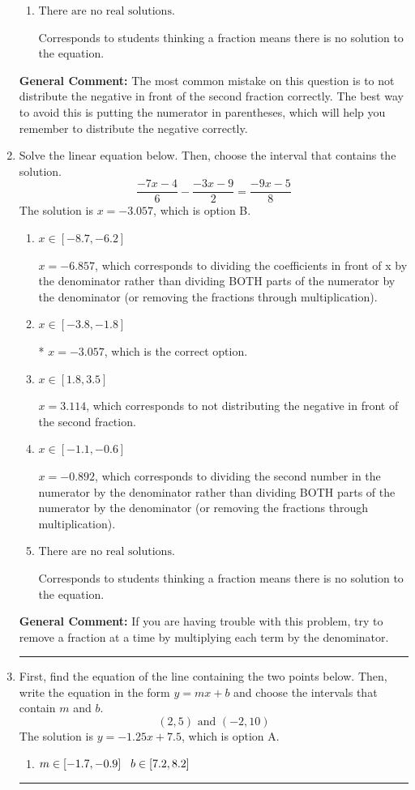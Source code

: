 \documentclass{extbook}[14pt]
\newcommand{\litem}[1]{\item #1

\rule{\textwidth}{0.4pt}}
\begin{document}
\begin{enumerate}
{\begin{enumerate}[label=\Alph*.]
* $x = 0.000$, which is the correct option.
\item \( \text{There are no real solutions.} \)

Corresponds to students thinking a fraction means there is no solution to the equation.
\end{enumerate}

\textbf{General Comment:} The most common mistake on this question is to not distribute the negative in front of the second fraction correctly. The best way to avoid this is putting the numerator in parentheses, which will help you remember to distribute the negative correctly.
}
\litem{
Solve the linear equation below. Then, choose the interval that contains the solution.
\[ \frac{-7x -4}{6} - \frac{-3x -9}{2} = \frac{-9x -5}{8} \]The solution is \( x = -3.057 \), which is option B.\begin{enumerate}[label=\Alph*.]
\item \( x \in [-8.7, -6.2] \)

 $x = -6.857$, which corresponds to dividing the coefficients in front of x by the denominator rather than dividing BOTH parts of the numerator by the denominator (or removing the fractions through multiplication).
\item \( x \in [-3.8, -1.8] \)

* $x = -3.057$, which is the correct option.
\item \( x \in [1.8, 3.5] \)

 $x = 3.114$, which corresponds to not distributing the negative in front of the second fraction.
\item \( x \in [-1.1, -0.6] \)

 $x = -0.892$, which corresponds to dividing the second number in the numerator by the denominator rather than dividing BOTH parts of the numerator by the denominator (or removing the fractions through multiplication).
\item \( \text{There are no real solutions.} \)

Corresponds to students thinking a fraction means there is no solution to the equation.
\end{enumerate}

\textbf{General Comment:} If you are having trouble with this problem, try to remove a fraction at a time by multiplying each term by the denominator.
}
\litem{
First, find the equation of the line containing the two points below. Then, write the equation in the form $ y=mx+b $ and choose the intervals that contain $m$ and $b$.
\[ (2, 5) \text{ and } (-2, 10) \]The solution is \( y = -1.25x + 7.5 \), which is option A.\begin{enumerate}[label=\Alph*.]
\item \( m \in [-1.7, -0.9] \hspace*{3mm} b \in [7.2, 8.2] \)


\end{enumerate}}
\end{enumerate}
\end{document}
